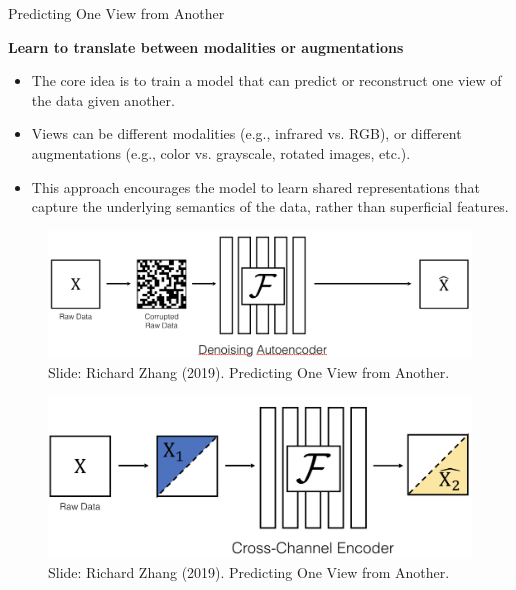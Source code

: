 \begin{frame}[allowframebreaks]{Predicting One View from Another}

    \textbf{Learn to translate between modalities or augmentations}
    \begin{itemize}
        \item The core idea is to train a model that can predict or reconstruct one view of the data given another.
        \item Views can be different modalities (e.g., infrared vs. RGB), or different augmentations (e.g., color vs. grayscale, rotated images, etc.).
        \item This approach encourages the model to learn shared representations that capture the underlying semantics of the data, rather than superficial features.
    \end{itemize}

    \framebreak

    \begin{figure}
        \flushleft
        \includegraphics[width=1\linewidth,height=\textheight,keepaspectratio]{images/ssl/slide_24_1_img.png}
        Slide: Richard Zhang (2019). Predicting One View from Another.
    \end{figure}

    \framebreak

    \begin{figure}
        \flushleft
        \includegraphics[width=1\linewidth,height=\textheight,keepaspectratio]{images/ssl/slide_25_1_img.png}
        Slide: Richard Zhang (2019). Predicting One View from Another.
    \end{figure}


\end{frame}

